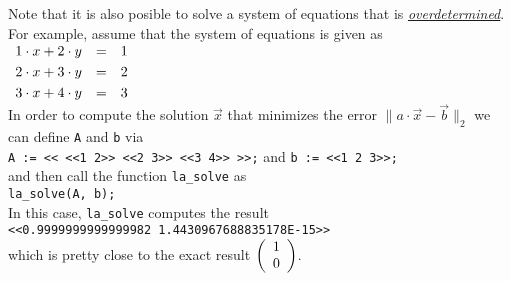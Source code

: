 Note that it is also posible to solve a system of equations that is 
\href{http://en.wikipedia.org/wiki/Overdetermined_system}{\emph{overdetermined}}.  For example,
assume that the system of equations is given as
\\[0.2cm]
\hspace*{1.3cm}
$
\begin{array}[c]{lcl}
  1 \cdot x + 2 \cdot y & = & 1 \\[0.1cm]
  2 \cdot x + 3 \cdot y & = & 2 \\[0.1cm]
  3 \cdot x + 4 \cdot y & = & 3 
\end{array}
$
\\[0.2cm]
In order to compute the solution $\vec{x}$ that minimizes the error
 $\|a \cdot \vec{x} - \vec{b}\|_2$ we can 
define \texttt{A} and \texttt{b} via
\\[0.2cm]
\hspace*{1.3cm}
\texttt{A := << <<1 2>> <<2 3>> <<3 4>> >>;} \quad and \quad \texttt{b := <<1 2 3>>;}
\\[0.2cm]
and then call  the function \texttt{la\_solve} as 
\\[0.2cm]
\hspace*{1.3cm}
\texttt{la\_solve(A, b);}
\\[0.2cm]
In this case, \texttt{la\_solve} computes the result
\\[0.2cm]
\hspace*{1.3cm}
\texttt{<<0.9999999999999982 1.4430967688835178E-15>>}
\\[0.2cm]
which is pretty close to the exact result $\left(\begin{array}[c]{l} 1 \\ 0 \end{array}\right)$.
\vspace*{0.3cm}

